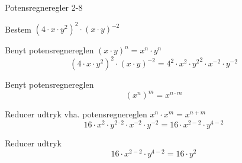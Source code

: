 \documentclass{article}
\begin{document}
\begin{exercise}{Potensregneregler 2-8}
	
	Bestem $(4 \cdot x \cdot y^2)^2 \cdot (x \cdot y)^{-2}$
	
	
	\hint
	
	Benyt potensregnereglen $(x \cdot y)^n = x^n \cdot y^n$
	\[
	(4 \cdot x \cdot y^2)^2 \cdot (x \cdot y)^{-2} = 4^2 \cdot x^2 \cdot {y^2}^2 \cdot x^{-2} \cdot y^{-2}
	\]
		
	\hint
	Benyt potensregnereglen 
	\[
	(x^n)^m = x^{n \cdot m}
	\]
	
	\hint 
	Reducer udtryk vha. potensregnereglen $x^n \cdot x^m  = x^{n+m}$
	\[
	16 \cdot x^2 \cdot y^{2\cdot 2} \cdot x^{-2} \cdot y^{-2} = 16 \cdot x^{2-2} \cdot y^{4-2}
	\]
	
	\hint 
	
	Reducer udtryk
	\[
	16 \cdot x^{2-2} \cdot y^{4-2} = 16 \cdot y^2
	\]
	
\end{exercise}
\end{document}
